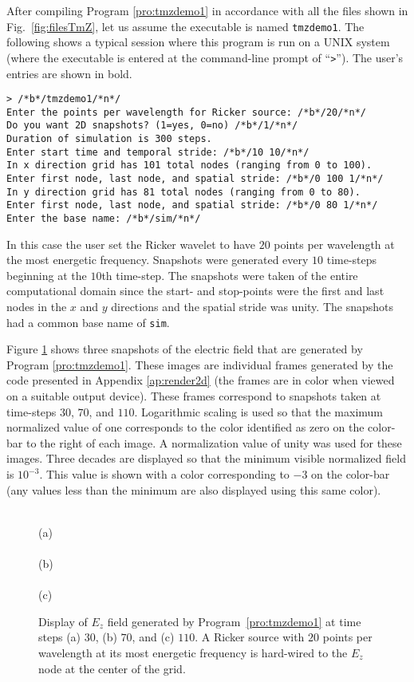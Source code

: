 After compiling Program \ref{pro:tmzdemo1} in accordance with all the
files shown in Fig.\ \ref{fig:filesTmZ}, let us assume the executable
is named {\tt tmzdemo1}.  The following shows a typical session where
this program is run on a UNIX system (where the executable is entered
at the command-line prompt of ``{\tt >}'').  The user's entries are
shown in bold.
\begin{lstlisting}[numbers=none]
> /*b*/tmzdemo1/*n*/
Enter the points per wavelength for Ricker source: /*b*/20/*n*/
Do you want 2D snapshots? (1=yes, 0=no) /*b*/1/*n*/
Duration of simulation is 300 steps.
Enter start time and temporal stride: /*b*/10 10/*n*/
In x direction grid has 101 total nodes (ranging from 0 to 100).
Enter first node, last node, and spatial stride: /*b*/0 100 1/*n*/
In y direction grid has 81 total nodes (ranging from 0 to 80).
Enter first node, last node, and spatial stride: /*b*/0 80 1/*n*/
Enter the base name: /*b*/sim/*n*/
\end{lstlisting}
In this case the user set the Ricker wavelet to have $20$ points per
wavelength at the most energetic frequency.  Snapshots were generated
every $10$ time-steps beginning at the $10$th time-step.  The
snapshots were taken of the entire computational domain since the
start- and stop-points were the first and last nodes in the $x$ and
$y$ directions and the spatial stride was unity.  The snapshots had a
common base name of {\tt sim}.

Figure \ref{fig:tmzSnapshots} shows three snapshots of the electric
field that are generated by Program \ref{pro:tmzdemo1}.  These images
are individual frames generated by the code presented in Appendix
\ref{ap:render2d} (the frames are in color when viewed on a suitable
output device).  These frames correspond to snapshots taken at
time-steps $30$, $70$, and $110$.  Logarithmic scaling is used so that
the maximum normalized value of one corresponds to the color
identified as zero on the color-bar to the right of each image.  A
normalization value of unity was used for these images.  Three decades
are displayed so that the minimum visible normalized field is
$10^{-3}$.  This value is shown with a color corresponding to $-3$ on
the color-bar (any values less than the minimum are also displayed
using this same color).

\begin{figure}
  \begin{center}
  \\ (a) \\
  \\ (b) \\
  \\ (c) \end{center} \caption{Display of $E_z$ field generated by
  Program\ \ref{pro:tmzdemo1} at time steps (a) $30$, (b) $70$, and
  (c) $110$.  A Ricker source with $20$ points per wavelength at its
  most energetic frequency is hard-wired to the $E_z$ node at the
  center of the grid.}  \label{fig:tmzSnapshots}
\end{figure}

